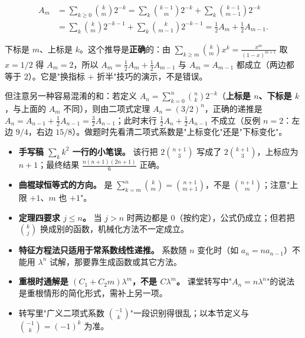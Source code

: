 \[
  \begin{aligned}
  A_m&=\sum_{k\ge0}\binom{k}{m}2^{-k}
  =\sum_k\binom{k-1}{m}2^{-k}+\sum_k\binom{k-1}{m-1}2^{-k}\\
  &=\sum_k\binom{k}{m}2^{-k-1}+\sum_k\binom{k}{m-1}2^{-k-1}
  =\frac12A_m+\frac12A_{m-1}.
  \end{aligned}
\]

  下标是 $m$、上标是 $k$。这个推导是\textbf{正确}的：由 $\sum_{k\ge m}\binom{k}{m}x^k=\frac{x^m}{(1-x)^{m+1}}$ 取 $x=1/2$ 得 $A_m=2$，所以 $A_m=\frac12A_m+\frac12A_{m-1}$ 与 $A_m=A_{m-1}$ 都成立（两边都等于 $2$）。它是"换指标 $+$ 折半"技巧的演示，不是错误。

  但注意另一种容易混淆的和：若定义 $A_n=\sum_{k=0}^{n}\binom{n}{k}2^{-k}$（\textbf{上标是 $n$、下标是 $k$}，与上面的 $A_m$ 不同），则由二项式定理 $A_n=(3/2)^n$，正确的递推是 $A_n=A_{n-1}+\frac12A_{n-1}=\frac32A_{n-1}$；此时末行 $\frac12A_n+\frac12A_{n-1}$ 不成立（反例 $n=2$：左边 $9/4$，右边 $15/8$）。做题时先看清二项式系数是"上标变化"还是"下标变化"。
\begin{itemize}
\item \textbf{手写稿 $\sum_k k^2$ 一行的小笔误。} 该行把 $2\binom{n+1}{3}$ 写成了 $2\binom{k+1}{3}$，上标应为 $n+1$；最终结果 $\frac{n(n+1)(2n+1)}6$ 正确。
\item \textbf{曲棍球恒等式的方向。} 是 $\sum_{k=m}^n\binom km=\binom{n+1}{m+1}$，不是 $\binom{n+1}{m}$；注意"上限 $+1$、$m$ 也 $+1$"。
\item \textbf{定理四要求 $j\le n$。} 当 $j>n$ 时两边都是 $0$（按约定），公式仍成立；但若把 $\binom kj$ 换成别的函数，机械化方法不一定成立。
\item \textbf{特征方程法只适用于常系数线性递推。} 系数随 $n$ 变化时（如 $a_n=na_{n-1}$）不能用 $\lambda^n$ 试解，那要靠生成函数或其它方法。
\item \textbf{重根时通解是 $(C_1+C_2m)\lambda^m$，不是 $C\lambda^m$。} 课堂转写中"$A_n=n\lambda^n$"的说法是重根情形的简化形式，需补上另一项。
\item 转写里"广义二项式系数 $\binom{-1}{k}$"一段识别得很乱；以本节定义与 $\binom{-1}{k}=(-1)^k$ 为准。
\end{itemize}

